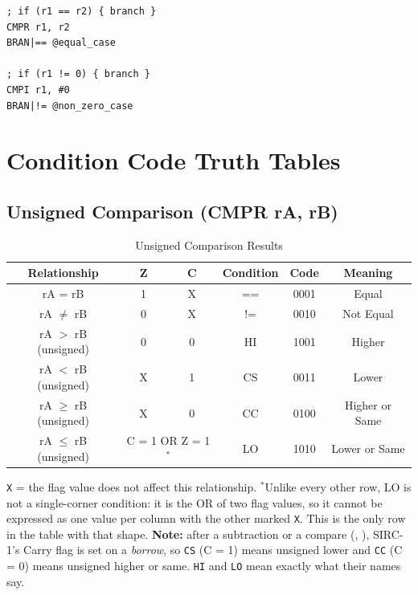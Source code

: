 \begin{example}
	\begin{lstlisting}
; if (r1 == r2) { branch }
CMPR r1, r2
BRAN|== @equal_case

; if (r1 != 0) { branch }
CMPI r1, #0
BRAN|!= @non_zero_case
	\end{lstlisting}
	\caption{Equality Testing}
\end{example}

\section{Condition Code Truth Tables}

\subsection{Unsigned Comparison (CMPR rA, rB)}

\begin{table}[H]
	\centering
	\begin{tabular}{cccccc}
		\toprule
		\textbf{Relationship}   & \textbf{Z}                               & \textbf{C} & \textbf{Condition} & \textbf{Code} & \textbf{Meaning} \\
		\midrule
		rA = rB                 & 1                                        & X          & ==                 & 0001          & Equal            \\
		rA $\neq$ rB            & 0                                        & X          & !=                 & 0010          & Not Equal        \\
		rA $>$ rB (unsigned)    & 0                                        & 0          & HI                 & 1001          & Higher           \\
		rA $<$ rB (unsigned)    & X                                        & 1          & CS                 & 0011          & Lower            \\
		rA $\geq$ rB (unsigned) & X                                        & 0          & CC                 & 0100          & Higher or Same   \\
		rA $\leq$ rB (unsigned) & \multicolumn{2}{c}{C = 1 OR Z = 1$^{*}$} & LO         & 1010               & Lower or Same                    \\
		\bottomrule
	\end{tabular}
	\caption{Unsigned Comparison Results}

	\smallskip
	\texttt{X} = the flag value does not affect this relationship.
	\newline
	$^{*}$Unlike every other row, LO is not a single-corner condition: it is the OR of two flag values, so it cannot
	be expressed as one value per column with the other marked \texttt{X}. This is the only row in the table with
	that shape.
	\newline
	\textbf{Note:} after a subtraction or a compare (, ), SIRC-1's Carry flag is set on a \emph{borrow}, so
	\texttt{CS} (C = 1) means unsigned lower and \texttt{CC} (C = 0) means unsigned higher or same. \texttt{HI} and
	\texttt{LO} mean exactly what their names say.
\end{table}

